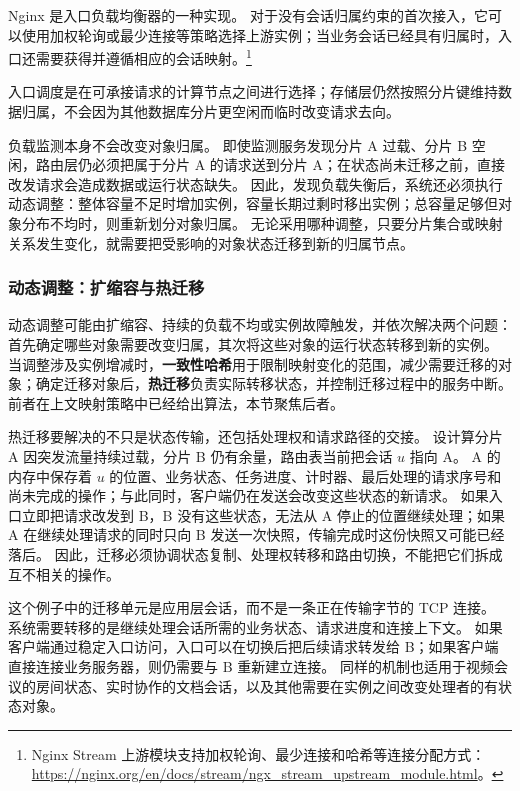 Nginx 是入口负载均衡器的一种实现。
对于没有会话归属约束的首次接入，它可以使用加权轮询或最少连接等策略选择上游实例；当业务会话已经具有归属时，入口还需要获得并遵循相应的会话映射。\footnote{Nginx Stream 上游模块支持加权轮询、最少连接和哈希等连接分配方式：\url{https://nginx.org/en/docs/stream/ngx_stream_upstream_module.html}。}

入口调度是在可承接请求的计算节点之间进行选择；存储层仍然按照分片键维持数据归属，不会因为其他数据库分片更空闲而临时改变请求去向。

负载监测本身不会改变对象归属。
即使监测服务发现分片 A 过载、分片 B 空闲，路由层仍必须把属于分片 A 的请求送到分片 A；在状态尚未迁移之前，直接改发请求会造成数据或运行状态缺失。
因此，发现负载失衡后，系统还必须执行动态调整：整体容量不足时增加实例，容量长期过剩时移出实例；总容量足够但对象分布不均时，则重新划分对象归属。
无论采用哪种调整，只要分片集合或映射关系发生变化，就需要把受影响的对象状态迁移到新的归属节点。

\subsubsection{动态调整：扩缩容与热迁移}\label{sec4:dynamic-adjustment}
\label{sec4:runtime-migration}%

动态调整可能由扩缩容、持续的负载不均或实例故障触发，并依次解决两个问题：首先确定哪些对象需要改变归属，其次将这些对象的运行状态转移到新的实例。
当调整涉及实例增减时，\textbf{一致性哈希}用于限制映射变化的范围，减少需要迁移的对象；确定迁移对象后，\textbf{热迁移}负责实际转移状态，并控制迁移过程中的服务中断。
前者在上文映射策略中已经给出算法，本节聚焦后者。

热迁移要解决的不只是状态传输，还包括处理权和请求路径的交接。
设计算分片 A 因突发流量持续过载，分片 B 仍有余量，路由表当前把会话 $u$ 指向 A。
A 的内存中保存着 $u$ 的位置、业务状态、任务进度、计时器、最后处理的请求序号和尚未完成的操作；与此同时，客户端仍在发送会改变这些状态的新请求。
如果入口立即把请求改发到 B，B 没有这些状态，无法从 A 停止的位置继续处理；如果 A 在继续处理请求的同时只向 B 发送一次快照，传输完成时这份快照又可能已经落后。
因此，迁移必须协调状态复制、处理权转移和路由切换，不能把它们拆成互不相关的操作。

这个例子中的迁移单元是应用层会话，而不是一条正在传输字节的 TCP 连接。
系统需要转移的是继续处理会话所需的业务状态、请求进度和连接上下文。
如果客户端通过稳定入口访问，入口可以在切换后把后续请求转发给 B；如果客户端直接连接业务服务器，则仍需要与 B 重新建立连接。
同样的机制也适用于视频会议的房间状态、实时协作的文档会话，以及其他需要在实例之间改变处理者的有状态对象。

